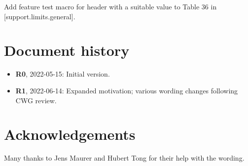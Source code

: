 Add feature test macro
 for header  with a suitable value to
Table 36 in [support.limits.general].


\section*{Document history}

\begin{itemize}
\item \textbf{R0}, 2022-05-15: Initial version.
\item \textbf{R1}, 2022-06-14: Expanded motivation; various wording changes following CWG review.
\end{itemize}


\section*{Acknowledgements}

Many thanks to Jens Maurer and Hubert Tong for their help with the wording.


\renewcommand{\bibname}{References}



